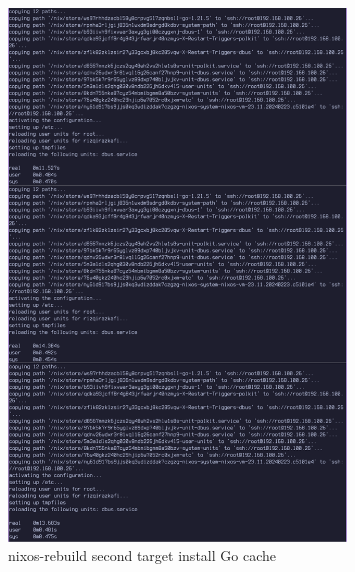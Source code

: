 \documentclass[10pt,]{report}
\begin{document}
\begin{adjustwidth}{20pt}{}
	\begin{figure}[H]
		\begin{center}
			\includegraphics[width=0.8\textwidth]{images/nix-target/nix-go-cache-26-com.png}
		\end{center}
		\caption{nixos-rebuild second target install Go cache}
	\end{figure}


\end{adjustwidth}
\end{document}
